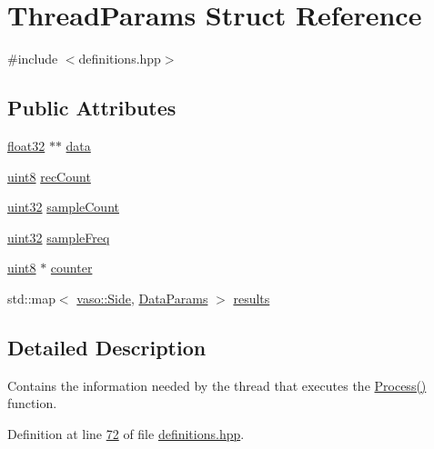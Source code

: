 \hypertarget{structThreadParams}{\section{Thread\+Params Struct Reference}
\label{structThreadParams}
}


{\ttfamily \#include $<$definitions.\+hpp$>$}

\subsection*{Public Attributes}
\begin{DoxyCompactItemize}
\item 
\hyperlink{definitions_8hpp_aacdc525d6f7bddb3ae95d5c311bd06a1}{float32} $\ast$$\ast$ \hyperlink{structThreadParams_a94da463ea449a9fe597b442be56844b9}{data}
\item 
\hyperlink{definitions_8hpp_adde6aaee8457bee49c2a92621fe22b79}{uint8} \hyperlink{structThreadParams_a02e6a905a01a79e8b73fbe21318f82b0}{rec\+Count}
\item 
\hyperlink{definitions_8hpp_a1134b580f8da4de94ca6b1de4d37975e}{uint32} \hyperlink{structThreadParams_ad953eac404cb1fe5057bb6e8fd8bf63f}{sample\+Count}
\item 
\hyperlink{definitions_8hpp_a1134b580f8da4de94ca6b1de4d37975e}{uint32} \hyperlink{structThreadParams_a4c35a854b35945bda8ce13c01123e420}{sample\+Freq}
\item 
\hyperlink{definitions_8hpp_adde6aaee8457bee49c2a92621fe22b79}{uint8} $\ast$ \hyperlink{structThreadParams_aa23fd1fa0f6a8d38cb42d8ee852bc6a6}{counter}
\item 
std\+::map$<$ \hyperlink{namespacevaso_a77c5d9704657d49d456f691ddd8abf7c}{vaso\+::\+Side}, \hyperlink{structDataParams}{Data\+Params} $>$ \hyperlink{structThreadParams_a2332b920eca7ca1fa61cc078e99e0668}{results}
\end{DoxyCompactItemize}


\subsection{Detailed Description}
Contains the information needed by the thread that executes the \hyperlink{namespacevaso_a0a7aa548b31b50c92be5b08bcb1df9a0}{Process()} function. 

Definition at line \hyperlink{definitions_8hpp_source_l00072}{72} of file \hyperlink{definitions_8hpp_source}{definitions.\+hpp}.



